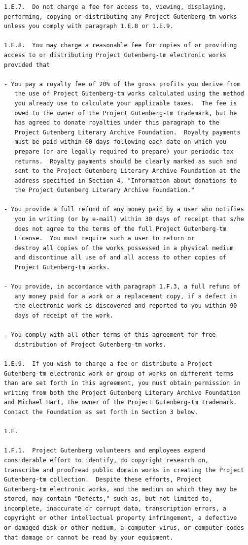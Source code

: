 \documentclass[oneside]{book}
\begin{document}
\begin{verbatim}
1.E.7.  Do not charge a fee for access to, viewing, displaying,
performing, copying or distributing any Project Gutenberg-tm works
unless you comply with paragraph 1.E.8 or 1.E.9.

1.E.8.  You may charge a reasonable fee for copies of or providing
access to or distributing Project Gutenberg-tm electronic works
provided that

- You pay a royalty fee of 20% of the gross profits you derive from
   the use of Project Gutenberg-tm works calculated using the method
   you already use to calculate your applicable taxes.  The fee is
   owed to the owner of the Project Gutenberg-tm trademark, but he
   has agreed to donate royalties under this paragraph to the
   Project Gutenberg Literary Archive Foundation.  Royalty payments
   must be paid within 60 days following each date on which you
   prepare (or are legally required to prepare) your periodic tax
   returns.  Royalty payments should be clearly marked as such and
   sent to the Project Gutenberg Literary Archive Foundation at the
   address specified in Section 4, "Information about donations to
   the Project Gutenberg Literary Archive Foundation."

- You provide a full refund of any money paid by a user who notifies
   you in writing (or by e-mail) within 30 days of receipt that s/he
   does not agree to the terms of the full Project Gutenberg-tm
   License.  You must require such a user to return or
   destroy all copies of the works possessed in a physical medium
   and discontinue all use of and all access to other copies of
   Project Gutenberg-tm works.

- You provide, in accordance with paragraph 1.F.3, a full refund of
   any money paid for a work or a replacement copy, if a defect in
   the electronic work is discovered and reported to you within 90
   days of receipt of the work.

- You comply with all other terms of this agreement for free
   distribution of Project Gutenberg-tm works.

1.E.9.  If you wish to charge a fee or distribute a Project
Gutenberg-tm electronic work or group of works on different terms
than are set forth in this agreement, you must obtain permission in
writing from both the Project Gutenberg Literary Archive Foundation
and Michael Hart, the owner of the Project Gutenberg-tm trademark.
Contact the Foundation as set forth in Section 3 below.

1.F.

1.F.1.  Project Gutenberg volunteers and employees expend
considerable effort to identify, do copyright research on,
transcribe and proofread public domain works in creating the Project
Gutenberg-tm collection.  Despite these efforts, Project
Gutenberg-tm electronic works, and the medium on which they may be
stored, may contain "Defects," such as, but not limited to,
incomplete, inaccurate or corrupt data, transcription errors, a
copyright or other intellectual property infringement, a defective
or damaged disk or other medium, a computer virus, or computer codes
that damage or cannot be read by your equipment.


\end{verbatim}
\end{document}
